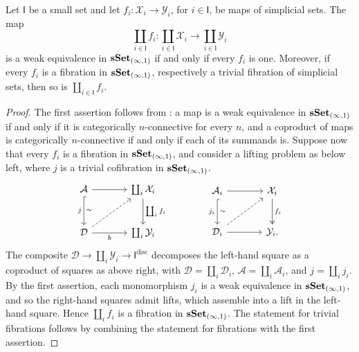 \documentclass[10pt,reqno]{amsart}
\begin{document}
\begin{lemma}
\label{lem:fixed_index_coproducts}
Let $\mathsf I$ be a small set and let
$f_i:\mathcal X_i\to\mathcal Y_i$, for $i\in\mathsf I$, be maps of
simplicial sets. The map
\[
\coprod_{i\in\mathsf I}f_i:
\coprod_{i\in\mathsf I}\mathcal X_i
\longrightarrow\coprod_{i\in\mathsf I}\mathcal Y_i
\]
is a weak equivalence in $\mathbf{sSet}_{(\infty,1)}$ if and only if every
$f_i$ is one. Moreover, if every $f_i$ is a fibration in
$\mathbf{sSet}_{(\infty,1)}$, respectively a trivial fibration of simplicial
sets, then so is $\coprod_{i\in\mathsf I}f_i$.
\end{lemma}
\begin{proof}
The first assertion follows from \cite[Tags~06SZ and~06T1,
Remarks~4.8.8.7 and~4.8.8.9]{kerodon}: a map is a weak equivalence in
$\mathbf{sSet}_{(\infty,1)}$ if and only if it is categorically
$n$-connective for every $n$, and a coproduct of maps is
categorically $n$-connective if and only if each of its summands is.
Suppose now that every $f_i$ is a fibration in
$\mathbf{sSet}_{(\infty,1)}$, and consider a lifting problem as below left,
where $j$ is a trivial cofibration in $\mathbf{sSet}_{(\infty,1)}$.
\[
\begin{tikzcd}[ampersand replacement=\&, sep=large]
\mathcal A\arrow[r]\arrow[d,hook,"j"',"\sim"]
\&\coprod_i\mathcal X_i\arrow[d,"{\coprod_i f_i}"]\\
\mathcal D\arrow[r,"b"']\arrow[ur,dashed]
\&\coprod_i\mathcal Y_i
\end{tikzcd}
\qquad \qquad
\begin{tikzcd}[ampersand replacement=\&, sep=large]
\mathcal A_i\arrow[r]\arrow[d,hook,"j_i"',"\sim"]
\&\mathcal X_i\arrow[d,two heads,"f_i"]\\
\mathcal D_i\arrow[r]\arrow[ur,dashed]\&\mathcal Y_i.
\end{tikzcd}
\]
The composite $\mathcal D\to\coprod_i\mathcal Y_i\to
\mathsf I^{\mathrm{disc}}$ decomposes the left-hand square as a
coproduct of squares as above right, with
$\mathcal D=\coprod_i\mathcal D_i$,
$\mathcal A=\coprod_i\mathcal A_i$, and $j=\coprod_i j_i$.
By the first assertion, each monomorphism $j_i$ is a weak
equivalence in $\mathbf{sSet}_{(\infty,1)}$, and so the right-hand squares
admit lifts, which assemble into a lift in the left-hand square.
Hence $\coprod_if_i$ is a fibration in $\mathbf{sSet}_{(\infty,1)}$. The
statement for trivial fibrations follows by combining the statement
for fibrations with the first assertion.
\end{proof}
\end{document}
